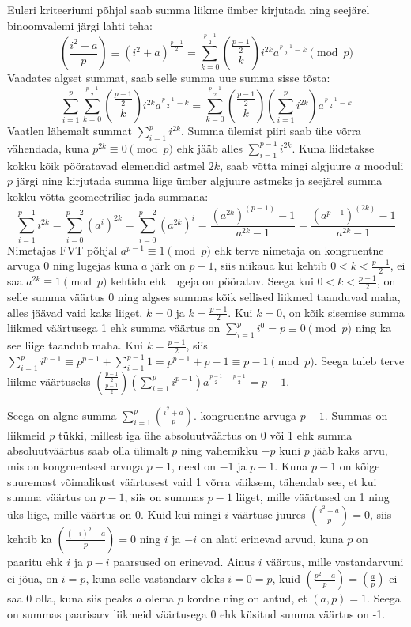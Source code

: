 \documentclass[a4paper, 10pt]{article}
\newcommand{\leg}[2]{\left(\frac{#1}{#2}\right)}
\begin{document}
\bigskip
Euleri kriteeriumi põhjal saab summa liikme ümber kirjutada ning seejärel binoomvalemi järgi lahti teha: $$\leg{i^2+a}p\equiv(i^2+a)^{\frac{p-1}2}=\sum_{k=0}^{\frac{p-1}2}\binom{\frac{p-1}2}{k}i^{2k}a^{\frac{p-1}2-k}\pmod p$$Vaadates algset summat, saab selle summa uue summa sisse tõsta:$$\sum\limits_{i=1}^{p}\sum_{k=0}^{\frac{p-1}2}\binom{\frac{p-1}2}{k}i^{2k}a^{\frac{p-1}2-k}=\sum_{k=0}^{\frac{p-1}2}\binom{\frac{p-1}2}{k}\left(\sum\limits_{i=1}^{p}i^{2k}\right)a^{\frac{p-1}2-k}$$ 
Vaatlen lähemalt summat $\sum_{i=1}^{p}i^{2k}$. Summa ülemist piiri saab ühe võrra vähendada, kuna $p^{2k}\equiv0\pmod p$ ehk jääb alles $\sum_{i=1}^{p-1}i^{2k}$. Kuna liidetakse kokku kõik pööratavad elemendid astmel $2k$, saab võtta mingi algjuure $a$ mooduli $p$ järgi ning kirjutada summa liige ümber algjuure astmeks ja seejärel summa kokku võtta geomeetrilise jada summana: $$\sum_{i=1}^{p-1}i^{2k}=\sum_{i=0}^{p-2}(a^i)^{2k}=\sum_{i=0}^{p-2}(a^{2k})^{i}=\frac{(a^{2k})^{(p-1)}-1}{a^{2k}-1}=\frac{(a^{p-1})^{(2k)}-1}{a^{2k}-1}$$
Nimetajas FVT põhjal $a^{p-1}\equiv1\pmod p$ ehk terve nimetaja on kongruentne arvuga 0 ning lugejas kuna $a$ järk on $p-1$, siis niikaua kui kehtib $0<k<\frac{p-1}2$, ei saa $a^{2k}\equiv1\pmod p$ kehtida ehk lugeja on pööratav. Seega kui $0<k<\frac{p-1}2$, on selle summa väärtus 0 ning algses summas kõik sellised liikmed taanduvad maha, alles jäävad vaid kaks liiget, $k=0$ ja $k=\frac{p-1}2$. Kui $k=0$, on kõik sisemise summa liikmed väärtusega 1 ehk summa väärtus on $\sum_{i=1}^{p}i^{0}=p\equiv0\pmod p$ ning ka see liige taandub maha. Kui $k=\frac{p-1}2$, siis $\sum_{i=1}^{p}i^{p-1}\equiv p^{p-1}+\sum_{i=1}^{p-1}1=p^{p-1}+p-1\equiv p-1\pmod p$. Seega tuleb terve liikme väärtuseks $\binom{\frac{p-1}2}{\frac{p-1}2}\left(\sum\limits_{i=1}^{p}i^{p-1}\right)a^{\frac{p-1}2-\frac{p-1}2}=p-1$.

Seega on algne summa $\sum\limits_{i=1}^{p}\left(\frac{i^2+a}{p}\right).$ kongruentne arvuga $p-1$. Summas on liikmeid $p$ tükki, millest iga ühe absoluutväärtus on 0 või 1 ehk summa absoluutväärtus saab olla ülimalt $p$ ning vahemikku $-p$ kuni $p$ jääb kaks arvu, mis on kongruentsed arvuga $p-1$, need on $-1$ ja $p-1$. Kuna $p-1$ on kõige suuremast võimalikust väärtusest vaid 1 võrra väiksem, tähendab see, et kui summa väärtus on $p-1$, siis on summas $p-1$ liiget, mille väärtused on 1 ning üks liige, mille väärtus on 0. Kuid kui mingi $i$ väärtuse juures $\leg{i^2+a}{p}=0$, siis kehtib ka $\leg{(-i)^2+a}{p}=0$ ning $i$ ja $-i$ on alati erinevad arvud, kuna $p$ on paaritu ehk $i$ ja $p-i$ paarsused on erinevad. Ainus $i$ väärtus, mille vastandarvuni ei jõua, on $i=p$, kuna selle vastandarv oleks $i=0=p$, kuid $\leg{p^2+a}{p}=\leg{a}{p}$ ei saa 0 olla, kuna siis peaks $a$ olema $p$ kordne ning on antud, et $(a,p)=1$. Seega on summas paarisarv liikmeid väärtusega 0 ehk küsitud summa väärtus on -1.
\bigskip
\end{document}
